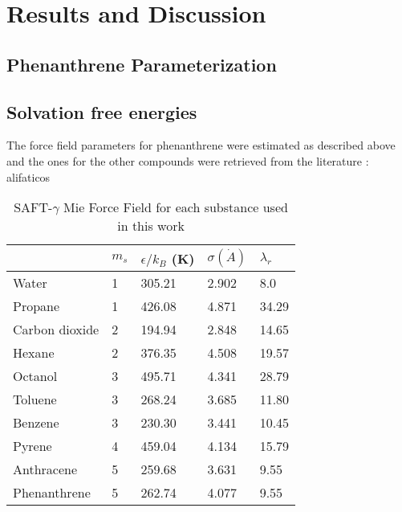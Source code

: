 \chapter{Results and Discussion} %

\label{Chapter5} %

\section{Phenanthrene Parameterization}


\section{Solvation free energies}

The force field parameters for phenanthrene were estimated as described above and the ones for the other compounds were retrieved from the literature \cite{lobanova2016,herdes2015,ervik2016,muller2017}:
alifaticos
\begin{table*}[h]
\center
  \caption{SAFT-$\gamma$ Mie Force Field for each substance used in this work}
  \label{tbl:parameters}
  \begin{tabular}{lllll}
  	\hline
  	               & $m_s$ & $\epsilon/k_{B}$ (K) & $\sigma (\dot{A})$ & $\lambda_r$ \\ \hline
  	Water          & 1     & 305.21               & 2.902              & 8.0         \\
  	Propane        & 1     & 426.08               & 4.871              & 34.29       \\
  	Carbon dioxide & 2     & 194.94               & 2.848              & 14.65       \\
  	Hexane         & 2     & 376.35               & 4.508              & 19.57       \\
  	Octanol        & 3     & 495.71               & 4.341              & 28.79       \\
  	Toluene        & 3     & 268.24               & 3.685              & 11.80       \\
  	Benzene        & 3     & 230.30               & 3.441              & 10.45       \\
  	Pyrene         & 4     & 459.04               & 4.134              & 15.79       \\
  	Anthracene     & 5     & 259.68               & 3.631              & 9.55        \\
  	Phenanthrene   & 5     & 262.74               & 4.077              & 9.55        \\ \hline
  \end{tabular}

\end{table*}


